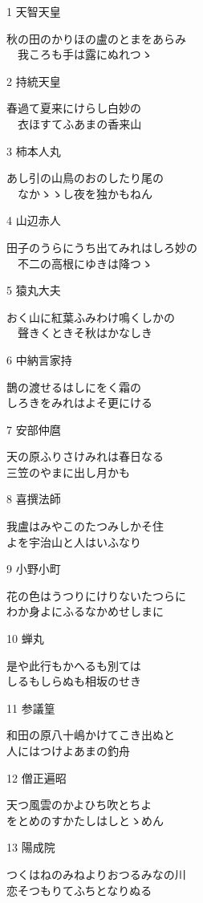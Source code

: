 
1  天智天皇     \begin{shiika}秋の田のかりほの盧のとまをあらみ\\　我ころも手は露にぬれつゝ 
\end{shiika}2  持統天皇     \begin{shiika}春過て夏来にけらし白妙の\\　衣ほすてふあまの香来山 
\end{shiika}3  柿本人丸     \begin{shiika}あし引の山鳥のおのしたり尾の\\　なかゝゝし夜を独かもねん 
\end{shiika}4  山辺赤人     \begin{shiika}田子のうらにうち出てみれはしろ妙の\\　不二の高根にゆきは降つゝ 
\end{shiika}5  猿丸大夫     \begin{shiika}おく山に紅葉ふみわけ鳴くしかの\\　聲きくときそ秋はかなしき 
\end{shiika}6  中納言家持   \begin{shiika}鵲の渡せるはしにをく霜の\\しろきをみれはよそ更にける 
\end{shiika}7  安部仲麿     \begin{shiika}天の原ふりさけみれは春日なる\\三笠のやまに出し月かも 
\end{shiika}8  喜撰法師     \begin{shiika}我盧はみやこのたつみしかそ住\\よを宇治山と人はいふなり 
\end{shiika}9  小野小町     \begin{shiika}花の色はうつりにけりないたつらに\\わか身よにふるなかめせしまに
\end{shiika}10 蝉丸         \begin{shiika}是や此行もかへるも別ては\\しるもしらぬも相坂のせき 
\end{shiika}11 参議篁       \begin{shiika}和田の原八十嶋かけてこき出ぬと　\\人にはつけよあまの釣舟 
\end{shiika}12 僧正遍昭     \begin{shiika}天つ風雲のかよひち吹とちよ\\をとめのすかたしはしとゝめん 
\end{shiika}13 陽成院       \begin{shiika}つくはねのみねよりおつるみなの川\\恋そつもりてふちとなりぬる 

\end{shiika}
